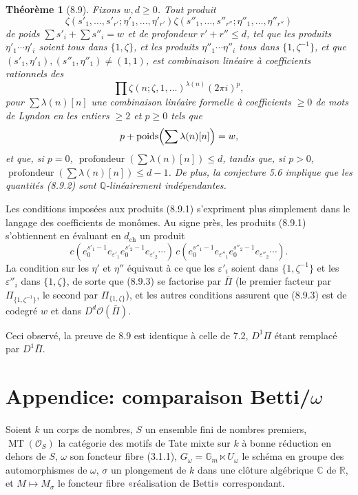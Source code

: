 \documentclass[10pt,a4paper]{article}
\newcommand{\Gm}{\mathbb G_m}
\newcommand{\Q}{\mathbb Q}
\newcommand{\MT}{\operatorname{MT}}
\newcommand{\OO}{\mathcal O}
\newcommand{\C}{\mathbb C}
\newcommand{\R}{\mathbb R}
\theoremstyle{deligne}
\newtheorem*{theorem*}{Théorème}
\newcommand{\heading}[1]{\vspace{0.65em}\noindent{\bfseries #1}\quad}
\begin{document}
\begin{theorem*}[8.9]
Fixons \(w,d\ge0\). Tout produit
\[
\tag{8.9.1}
\zeta(s'_1,\ldots,s'_{r'};\eta'_1,\ldots,\eta'_{r'})
\zeta(s''_1,\ldots,s''_{r''};\eta''_1,\ldots,\eta''_{r''})
\]
de poids \(\sum s'_i+\sum s''_i=w\) et de profondeur \(r'+r''\le d\), tel que les produits \(\eta'_1\cdots\eta'_i\) soient tous dans \(\{1,\zeta\}\), et les produits \(\eta''_1\cdots\eta''_i\) tous dans \(\{1,\zeta^{-1}\}\), et que \((s'_1,\eta'_1),(s''_1,\eta''_1)\ne(1,1)\), est combinaison linéaire à coefficients rationnels des
\[
\tag{8.9.2}
\prod\zeta(n;\zeta,1,\ldots)^{\lambda(n)}(2\pi i)^p,
\]
pour \(\sum\lambda(n)[n]\) une combinaison linéaire formelle à coefficients \(\ge0\) de mots de Lyndon en les entiers \(\ge2\) et \(p\ge0\) tels que
\[
p+\operatorname{poids}\Bigl(\sum\lambda(n)[n]\Bigr)=w,
\]
et que, si \(p=0\), \(\operatorname{profondeur}(\sum\lambda(n)[n])\le d\), tandis que, si \(p>0\), \(\operatorname{profondeur}(\sum\lambda(n)[n])\le d-1\). De plus, la conjecture 5.6 implique que les quantités (8.9.2) sont \(\Q\)-linéairement indépendantes.
\end{theorem*}

Les conditions imposées aux produits (8.9.1) s'expriment plus simplement dans le langage des coefficients de monômes. Au signe près, les produits (8.9.1) s'obtiennent en évaluant en \(d_{\mathrm{ch}}\) un produit
\[
\tag{8.9.3}
c(e_0^{s'_1-1}e_{\varepsilon'_1}e_0^{s'_2-1}e_{\varepsilon'_2}\cdots)
\,c(e_0^{s''_1-1}e_{\varepsilon''_1}e_0^{s''_2-1}e_{\varepsilon''_2}\cdots).
\]
La condition sur les \(\eta'\) et \(\eta''\) équivaut à ce que les \(\varepsilon'_i\) soient dans \(\{1,\zeta^{-1}\}\) et les \(\varepsilon''_i\) dans \(\{1,\zeta\}\), de sorte que (8.9.3) se factorise par \(\bar\Pi\) (le premier facteur par \(\Pi_{\{1,\zeta^{-1}\}}\), le second par \(\Pi_{\{1,\zeta\}}\)), et les autres conditions assurent que (8.9.3) est de codegré \(w\) et dans \(D^d\OO(\bar\Pi)\).

Ceci observé, la preuve de 8.9 est identique à celle de 7.2, \(D^1\Pi\) étant remplacé par \(D^1\bar\Pi\).

\section*{Appendice: comparaison Betti/\(\omega\)}

\heading{A.1.} Soient \(k\) un corps de nombres, \(S\) un ensemble fini de nombres premiers, \(\MT(\OO_S)\) la catégorie des motifs de Tate mixte sur \(k\) à bonne réduction en dehors de \(S\), \(\omega\) son foncteur fibre (3.1.1), \(G_\omega=\Gm\ltimes U_\omega\) le schéma en groupe des automorphismes de \(\omega\), \(\sigma\) un plongement de \(k\) dans une clôture algébrique \(\C\) de \(\R\), et \(M\mapsto M_\sigma\) le foncteur fibre «réalisation de Betti» correspondant.
\end{document}
